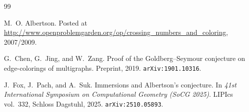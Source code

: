 \documentclass[11pt,a4paper]{article}
\theoremstyle{definition}
\begin{document}

\begin{thebibliography}{99}

M.~O. Albertson.
Posted at
\url{http://www.openproblemgarden.org/op/crossing_numbers_and_coloring},
2007/2009.

G.~Chen, G.~Jing, and W.~Zang.
Proof of the Goldberg--Seymour conjecture on edge-colorings of multigraphs.
Preprint, 2019.
\texttt{arXiv:1901.10316}.

J.~Fox, J.~Pach, and A.~Suk.
Immersions and Albertson's conjecture.
In \textit{41st International Symposium on Computational Geometry
   (SoCG 2025)}.
LIPIcs vol.~332, Schloss Dagstuhl, 2025.
\texttt{arXiv:2510.05893}.

\end{thebibliography}
\end{document}
